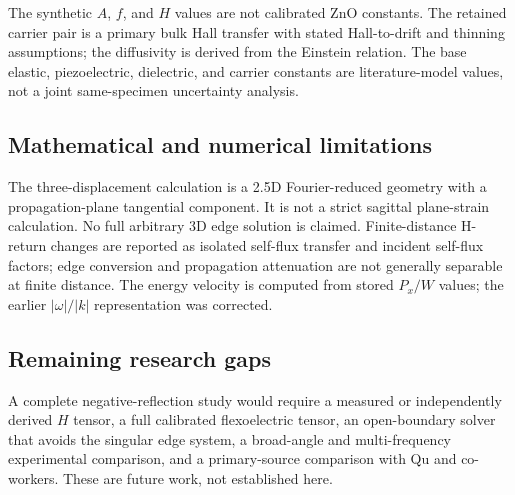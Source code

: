 The synthetic \(A\), \(f\), and \(H\) values are not calibrated ZnO constants. The
retained carrier pair is a primary bulk Hall transfer with stated Hall-to-drift
and thinning assumptions; the diffusivity is derived from the Einstein relation.
The base elastic, piezoelectric, dielectric, and carrier constants are literature-model
values, not a joint same-specimen uncertainty analysis.

\subsection{Mathematical and numerical limitations}
The three-displacement calculation is a 2.5D Fourier-reduced geometry with a
propagation-plane tangential component. It is not a strict sagittal plane-strain
calculation. No full arbitrary 3D edge solution is claimed. Finite-distance H-return
changes are reported as isolated self-flux transfer and incident self-flux factors;
edge conversion and propagation attenuation are not generally separable at finite
distance. The energy velocity is computed from stored \(P_x/W\) values; the earlier
\(|\omega|/|k|\) representation was corrected.

\subsection{Remaining research gaps}
A complete negative-reflection study would require a measured or independently
derived \(H\) tensor, a full calibrated flexoelectric tensor, an open-boundary
solver that avoids the singular edge system, a broad-angle and multi-frequency
experimental comparison, and a primary-source comparison with Qu and co-workers.
These are future work, not established here.
